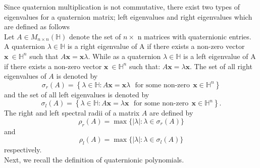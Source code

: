 \documentclass [12pt]{article}
\begin{document}
\noindent Since quaternion multiplication is not commutative, there exist two types of eigenvalues for a quaternion matrix; left eigenvalues and right eigenvalues  which are defined as follows\\
 Let $A \in M_{n \times n}(\mathbb{H})$ denote the set of $n \times$ n matrices with quaternionic entries. A quaternion $\lambda \in \mathbb{H}$ is a right eigenvalue of A if there exists a non-zero vector $\mathbf{x}\ \in \mathbb{H}^n$  such that $A\mathbf{x}=\mathbf{x}\lambda$.
While as a quaternion $\lambda \in \mathbb{H}$ is a left eigenvalue of A if there exists a non-zero vector $\mathbf{x}\ \in \mathbb{H}^n$  such that: $A\mathbf{x}=\lambda\mathbf{x}$.
The set of all right eigenvalues of $A$ is denoted by $$\sigma_r(A)=\left\{\lambda \in \mathbb{H}: A\mathbf{x}=\mathbf{x}\lambda ~~~\mbox{for some non-zero}~~ \mathbf{x}\in \mathbb{H}^{n} \right\}$$ and the set of all left eigenvalues is denoted by $$\sigma_l(A)=\left\{\lambda \in \mathbb{H}: A\mathbf{x}=\lambda\mathbf{x} ~~~\mbox{for some non-zero}~~ \mathbf{x}\in \mathbb{H}^{n} \right\}.$$  The right and left spectral radii of a matrix $A$ are defined by
$$\rho_{r}(A) = \max \{ |\lambda| : \lambda \in \sigma_r(A) \}$$ and $$\rho_{l}(A) = \max \{ |\lambda| : \lambda \in \sigma_l(A) \}$$ respectively.\\ Next, we recall the definition of quaternionic polynomials.
\end{document}
